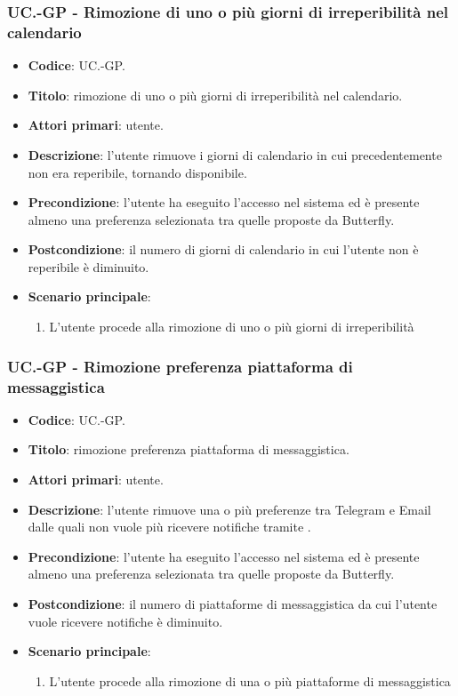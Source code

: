 	\subsubsection{UC\theuccount.\thesubuccount-GP - Rimozione di uno o più giorni di irreperibilità nel calendario}
	\begin{itemize}
		\item \textbf{Codice}: UC\theuccount.\thesubuccount-GP.
		\item \textbf{Titolo}: rimozione di uno o più giorni di irreperibilità nel calendario.
		\item \textbf{Attori primari}: utente.
		\item \textbf{Descrizione}: l’utente rimuove i giorni di calendario in cui precedentemente	non era reperibile, tornando disponibile.
		\item \textbf{Precondizione}: l’utente ha eseguito l'accesso nel sistema ed è presente almeno
        una preferenza selezionata tra quelle proposte da Butterfly.
		\item \textbf{Postcondizione}: il numero di giorni di calendario in cui l’utente non è reperibile è diminuito.
		\item \textbf{Scenario principale}:
		\begin{enumerate}
			\item L'utente procede alla rimozione di uno o più giorni di irreperibilità
		\end{enumerate}
	\end{itemize}

	\subsubsection{UC\theuccount.\thesubuccount-GP - Rimozione preferenza piattaforma di messaggistica}
	\begin{itemize}
		\item \textbf{Codice}: UC\theuccount.\thesubuccount-GP.
		\item \textbf{Titolo}: rimozione preferenza piattaforma di messaggistica.
		\item \textbf{Attori primari}: utente.
		\item \textbf{Descrizione}: l’utente rimuove una o più preferenze tra Telegram e Email dalle	quali non vuole più ricevere notifiche tramite \progetto.
		\item \textbf{Precondizione}: l’utente ha eseguito l'accesso nel sistema ed è presente almeno
        una preferenza selezionata tra quelle proposte da Butterfly.
		\item \textbf{Postcondizione}: il numero di piattaforme di messaggistica da cui l’utente vuole ricevere notifiche è diminuito.
		\item \textbf{Scenario principale}:
		\begin{enumerate}
			\item L'utente procede alla rimozione di una o più piattaforme di messaggistica
		\end{enumerate}
	\end{itemize}

